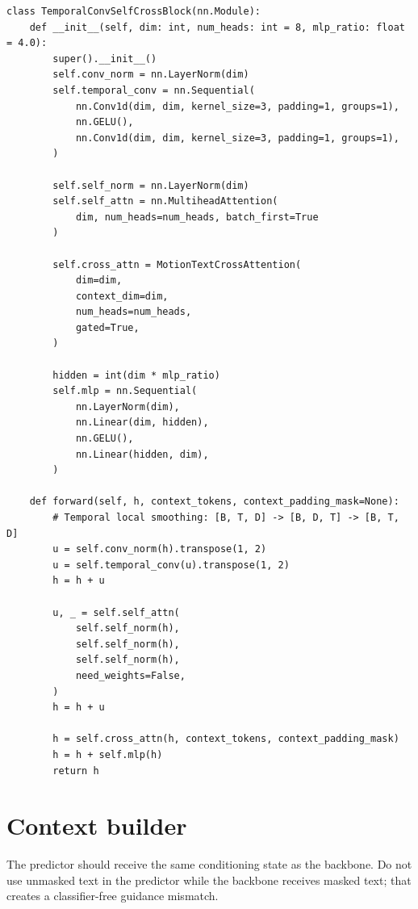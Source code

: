 \documentclass[11pt]{article}
\begin{document}
\begin{lstlisting}[style=python]
class TemporalConvSelfCrossBlock(nn.Module):
    def __init__(self, dim: int, num_heads: int = 8, mlp_ratio: float = 4.0):
        super().__init__()
        self.conv_norm = nn.LayerNorm(dim)
        self.temporal_conv = nn.Sequential(
            nn.Conv1d(dim, dim, kernel_size=3, padding=1, groups=1),
            nn.GELU(),
            nn.Conv1d(dim, dim, kernel_size=3, padding=1, groups=1),
        )

        self.self_norm = nn.LayerNorm(dim)
        self.self_attn = nn.MultiheadAttention(
            dim, num_heads=num_heads, batch_first=True
        )

        self.cross_attn = MotionTextCrossAttention(
            dim=dim,
            context_dim=dim,
            num_heads=num_heads,
            gated=True,
        )

        hidden = int(dim * mlp_ratio)
        self.mlp = nn.Sequential(
            nn.LayerNorm(dim),
            nn.Linear(dim, hidden),
            nn.GELU(),
            nn.Linear(hidden, dim),
        )

    def forward(self, h, context_tokens, context_padding_mask=None):
        # Temporal local smoothing: [B, T, D] -> [B, D, T] -> [B, T, D]
        u = self.conv_norm(h).transpose(1, 2)
        u = self.temporal_conv(u).transpose(1, 2)
        h = h + u

        u, _ = self.self_attn(
            self.self_norm(h),
            self.self_norm(h),
            self.self_norm(h),
            need_weights=False,
        )
        h = h + u

        h = self.cross_attn(h, context_tokens, context_padding_mask)
        h = h + self.mlp(h)
        return h
\end{lstlisting}

\section{Context builder}

The predictor should receive the same conditioning state as the backbone. Do
not use unmasked text in the predictor while the backbone receives masked text;
that creates a classifier-free guidance mismatch.
\end{document}
